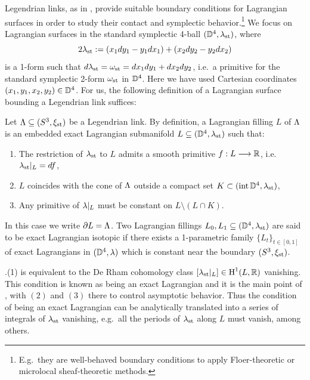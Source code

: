 \noindent Legendrian links, as in , provide suitable boundary conditions for Lagrangian surfaces in order to study their contact and symplectic behavior.\footnote{E.g.~they are well-behaved boundary conditions to apply Floer-theoretic or microlocal sheaf-theoretic methods.} We focus on Lagrangian surfaces in the standard symplectic 4-ball $(\mathbb{D}^4,\lambda_{\text{st}})$, where
\begin{equation}\label{eq:Liouville_form}
2\lambda_{\text{st}}:=(x_1 dy_1 - y_1 dx_1) + (x_2 dy_2 - y_2 dx_2)
\end{equation}
is a 1-form such that $d\lambda_{\text{st}}=\omega_{\text{st}}=dx_1dy_1+dx_2dy_2$, i.e.~a primitive for the standard symplectic 2-form $\omega_{\text{st}}$ in $\mathbb{D}^4$. Here we have used Cartesian coordinates $(x_1,y_1,x_2,y_2)\in \mathbb{D}^4$. For us, the following definition of a Lagrangian surface bounding a Legendrian link suffices:

\begin{definition}\label{def:Lagrangian_filling} Let $\Lambda\subseteq (S^3,\xi_{\text{st}})$ be a Legendrian link. By definition, a Lagrangian filling $L$ of $\Lambda$ is an embedded exact Lagrangian submanifold $L\subseteq(\mathbb{D}^4,\lambda_{\text{st}})$ such that:
\begin{enumerate}
    \item The restriction of $\lambda_{\text{st}}$ to $L$ admits a smooth primitive $f:L\longrightarrow\mathbb{R}$, i.e.~$\lambda_{\text{st}}|_L=df$,
    \item $L$ coincides with the cone of $\Lambda$ outside a compact set $K\subset(\operatorname{int} \mathbb{D}^4,\lambda_{\text{st}})$,
    \item Any primitive of $\lambda|_L$ must be constant on $L\setminus (L\cap K)$.
\end{enumerate}
In this case we write $\partial L=\Lambda$. Two Lagrangian fillings $L_0,L_1\subseteq(\mathbb{D}^4,\lambda_{\text{st}})$ are said to be exact Lagrangian isotopic if there exists a 1-parametric family $\{L_t\}_{t\in[0,1]}$ of exact Lagrangians in $(\mathbb{D}^4,\lambda)$ which is constant near the boundary $(S^3,\xi_{\text{st}})$.\sbs
\end{definition}

.(1) is equivalent to the De Rham cohomology class $[\lambda_{\text{st}}|_L]\in\operatorname{H}^1(L,\mathbb{R})$ vanishing. This condition is known as being an exact Lagrangian and it is the main point of , with $(2)$ and $(3)$ there to control asymptotic behavior. Thus the condition of being an exact Lagrangian can be analytically translated into a series of integrals of $\lambda_{\text{st}}$ vanishing, e.g.~all the periods of $\lambda_{\text{st}}$ along $L$ must vanish, among others.


